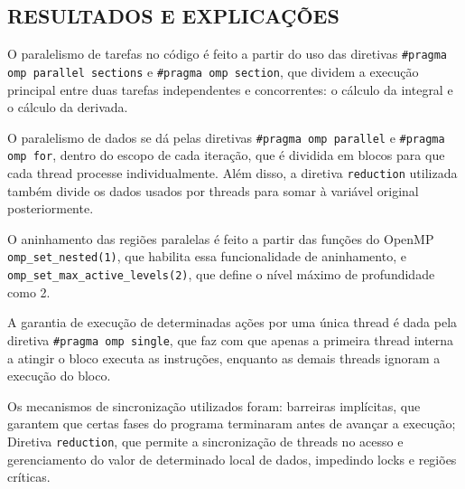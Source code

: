 \documentclass[12pt, openright, oneside, a4paper, brazil]{article}
\newcommand{\subtDois}{RESULTADOS E EXPLICAÇÕES}
\begin{document}
		\subsection{\subtDois}
			\par{O paralelismo de tarefas no código é feito a partir do uso das diretivas \texttt{\#pragma omp parallel sections} e \texttt{\#pragma omp section}, que dividem a execução principal entre duas tarefas independentes e concorrentes: o cálculo da integral e o cálculo da derivada.}
			\par{O paralelismo de dados se dá pelas diretivas \texttt{\#pragma omp parallel} e \texttt{\#pragma omp for}, dentro do escopo de cada iteração, que é dividida em blocos para que cada thread processe individualmente. Além disso, a diretiva \texttt{reduction} utilizada também divide os dados usados por threads para somar à variável original posteriormente.}
			\par{O aninhamento das regiões paralelas é feito a partir das funções do OpenMP \texttt{omp\_set\_nested(1)}, que habilita essa funcionalidade de aninhamento, e \texttt{omp\_set\_max\_active\_levels(2)}, que define o nível máximo de profundidade como 2.}
			\par{A garantia de execução de determinadas ações por uma única thread é dada pela diretiva \texttt{\#pragma omp single}, que faz com que apenas a primeira thread interna a atingir o bloco executa as instruções, enquanto as demais threads ignoram a execução do bloco.}
			\par{Os mecanismos de sincronização utilizados foram: barreiras implícitas, que garantem que certas fases do programa terminaram antes de avançar a execução; Diretiva \texttt{reduction}, que permite a sincronização de threads no acesso e gerenciamento do valor de determinado local de dados, impedindo locks e regiões críticas.}
\end{document}
